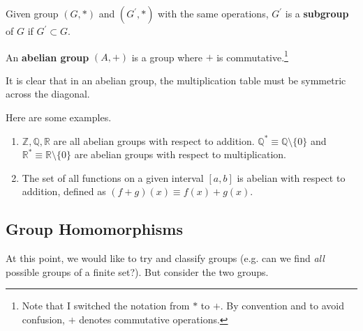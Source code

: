   \begin{definition}[Subgroup]
    Given group $(G, \ast)$ and $(G^\prime, \ast)$ with the same operations, $G^\prime$ is a \textbf{subgroup} of $G$ if $G^\prime \subset G$. 
  \end{definition} 

  \begin{definition}
    An \textbf{abelian group} $(A, +)$ is a group where $+$ is commutative.\footnote{Note that I switched the notation from $\ast$ to $+$. By convention and to avoid confusion, $+$ denotes commutative operations. }
  \end{definition} 

  It is clear that in an abelian group, the multiplication table must be symmetric across the diagonal. 

  \begin{example}
    Here are some examples. 
    \begin{enumerate}
      \item $\mathbb{Z}, \mathbb{Q}, \mathbb{R}$ are all abelian groups with respect to addition. $\mathbb{Q}^{*} \equiv \mathbb{Q} \setminus \{0\}$ and $\mathbb{R}^{*} \equiv \mathbb{R} \setminus \{0\}$ are abelian groups with respect to multiplication.
      \item The set of all functions on a given interval $[a,b]$ is abelian with respect to addition, defined as $(f+g)(x) \equiv f(x) + g(x)$. 
    \end{enumerate}
  \end{example} 

\subsection{Group Homomorphisms}

  At this point, we would like to try and classify groups (e.g. can we find \textit{all} possible groups of a finite set?). But consider the two groups. 

